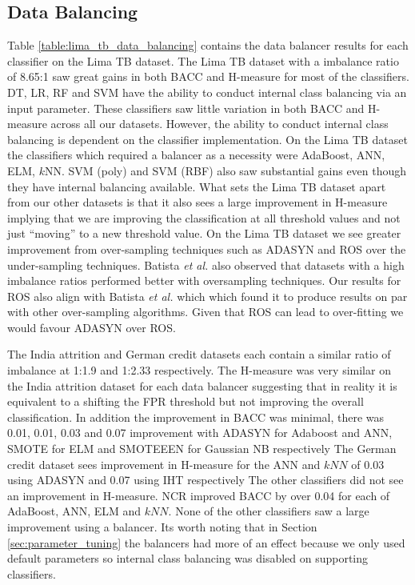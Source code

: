 \documentclass{sig-alternate-05-2015}
\begin{document}
	\subsection{Data Balancing}
	Table \ref{table:lima_tb_data_balancing} contains the data balancer results for each classifier on the Lima TB dataset. The Lima TB dataset with a imbalance ratio of 8.65:1 saw great gains in both BACC and H-measure for most of the classifiers. DT, LR, RF and SVM have the ability to conduct internal class balancing via an input parameter. These classifiers saw little variation in both BACC and H-measure across all our datasets. However, the ability to conduct internal class balancing is dependent on the classifier implementation. On the Lima TB dataset the classifiers which required a balancer as a necessity were AdaBoost, ANN, ELM, $k$NN. SVM (poly) and SVM (RBF) also saw substantial gains even though they have internal balancing available.  What sets the Lima TB dataset apart from our other datasets is that it also sees a large improvement in H-measure implying that we are improving the classification at all threshold values and not just ``moving'' to a new threshold value. On the Lima TB dataset we see greater improvement from over-sampling techniques such as ADASYN and ROS over the under-sampling techniques. Batista \textit{et al.} \cite{Batista:2004:SBS:1007730.1007735} also observed that datasets with a high imbalance ratios performed better with oversampling techniques. Our results for ROS also align with Batista \textit{et al.} \cite{Batista:2004:SBS:1007730.1007735} which which found it to produce results on par with other over-sampling algorithms. Given that ROS can lead to over-fitting \cite{batista2003balancing, Chawla:2004:ESI:1007730.1007733} we would favour ADASYN over ROS.
	
	The India attrition and German credit datasets each contain a similar ratio of imbalance at 1:1.9 and 1:2.33 respectively. The H-measure was very similar on the India attrition dataset for each data balancer suggesting that in reality it is equivalent to a shifting the FPR threshold but not improving the overall classification. In addition the improvement in BACC was minimal, there was 0.01, 0.01, 0.03 and 0.07 improvement with ADASYN for Adaboost and ANN, SMOTE for ELM and SMOTEEEN for Gaussian NB respectively The German credit dataset sees improvement in H-measure for the ANN and $kNN$ of 0.03 using ADASYN and 0.07 using IHT respectively The other classifiers did not see an improvement in H-measure. NCR improved BACC by over 0.04 for each of AdaBoost, ANN, ELM and $kNN$. None of the other classifiers saw a large improvement using a balancer. Its worth noting that in Section \ref{sec:parameter_tuning} the balancers had more of an effect because we only used default parameters so internal class balancing was disabled on supporting classifiers. 
	
\end{document}
